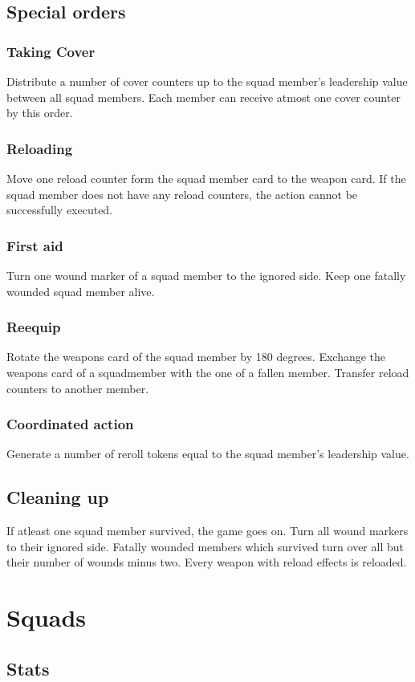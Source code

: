 \documentclass[twocolumn,titlepage]{article}
\begin{document}
\subsection{Special orders}
\subsubsection{Taking Cover}
Distribute a number of cover counters up to the squad member's leadership value between all squad members. Each member can receive atmost one cover counter by this order. 
\subsubsection{Reloading}
Move one reload counter form the squad member card to the weapon card. If the squad member does not have any reload counters, the action cannot be successfully executed.
\subsubsection{First aid}
Turn one wound marker of a squad member to the ignored side. Keep one fatally wounded squad member alive.
\subsubsection{Reequip}
Rotate the weapons card of the squad member by 180 degrees. Exchange the weapons card of a squadmember with the one of a fallen member. Transfer reload counters to another member.
\subsubsection{Coordinated action}
Generate a number of reroll tokens  equal to the squad member's leadership value.
\subsection{Cleaning up}
If atleast one squad member survived, the game goes on. Turn all wound markers to their ignored side. Fatally wounded members which survived turn over all but their number of wounds minus two. Every weapon with reload effects is reloaded.
\section{Squads}
\subsection{Stats}
\end{document}
